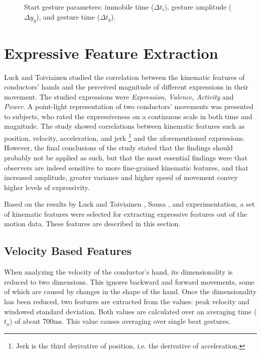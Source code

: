 \begin{figure}
\begin{center}

\caption{
Start gesture parameters:
immobile time ($\Delta t_i$),
gesture amplitude ($\Delta y_g$), and
gesture time ($\Delta t_g$).
}
\label{fig:start_gesture}
\end{center}
\end{figure}

\section{Expressive Feature Extraction}
\label{sec:expressive_feature_extraction}

Luck and Toiviainen \cite{luck2010}
studied the correlation between the kinematic features of conductors' hands
and the perceived magnitude of different expressions in their movement.
The studied expressions were
\textit{Expression}, \textit{Valence}, \textit{Activity} and \textit{Power}.
A point-light representation of two conductors' movements
was presented to subjects, who rated the expressiveness
on a continuous scale in both time and magnitude.
The study showed correlations between kinematic features
such as position, velocity, acceleration, and jerk%
\footnote{Jerk is the third derivative of position,
i.e. the derivative of acceleration.}
and the aforementioned expressions.
However, the final conclusions of the study stated that
the findings should probably not be applied as such,
but that the most essential findings were that observers
are indeed sensitive to more fine-grained kinematic features,
and that increased amplitude, greater variance and higher speed of movement
convey higher levels of expressivity.

Based on the results by Luck and Toiviainen \cite{luck2010},
Sousa \cite{sousa1988},
and experimentation,
a set of kinematic features were selected for extracting
expressive features out of the motion data.
These features are described in this section.

\subsection{Velocity Based Features}

When analyzing the velocity of the conductor's hand,
its dimensionality is reduced to two dimensions.
This ignores backward and forward movements,
some of which are caused by changes in the shape of the hand.
Once the dimensionality has been reduced,
two features are extracted from the values:
peak velocity and windowed standard deviation.
Both values are calculated over an averaging time ($t_a$)
of about 700ms.
This value causes averaging over single beat gestures.

